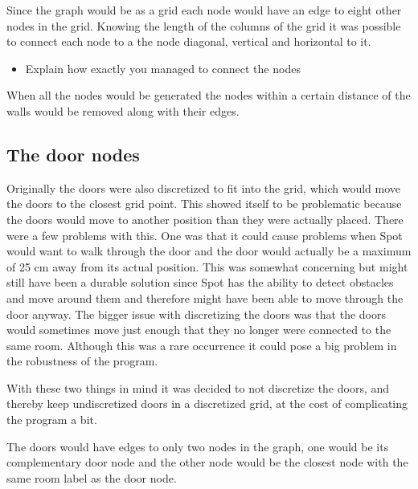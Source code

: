 Since the graph would be as a grid each node would have an edge to eight other nodes in the grid. Knowing the length of the columns of the grid it was possible to connect each node to a the node diagonal, vertical and horizontal to it. 

\begin{itemize}
    \item Explain how exactly you managed to connect the nodes
\end{itemize}

When all the nodes would be generated the nodes within a certain distance of the walls would be removed along with their edges.

\subsection{The door nodes}
Originally the doors were also discretized to fit into the grid, which would move the doors to the closest grid point. This showed itself to be problematic because the doors would move to another position than they were actually placed. 
There were a few problems with this. One was that it could cause problems when Spot would want to walk through the door and the door would actually be a maximum of 25 cm away from its actual position. This was somewhat concerning but might still have been a durable solution since Spot has the ability to detect obstacles and move around them and therefore might have been able to move through the door anyway.
The bigger issue with discretizing the doors was that the doors would sometimes move just enough that they no longer were connected to the same room. Although this was a rare occurrence it could pose a big problem in the robustness of the program.

With these two things in mind it was decided to not discretize the doors, and thereby keep undiscretized doors in a discretized grid, at the cost of complicating the program a bit.

The doors would have edges to only two nodes in the graph, one would be its complementary door node and the other node would be the closest node with the same room label as the door node. 



